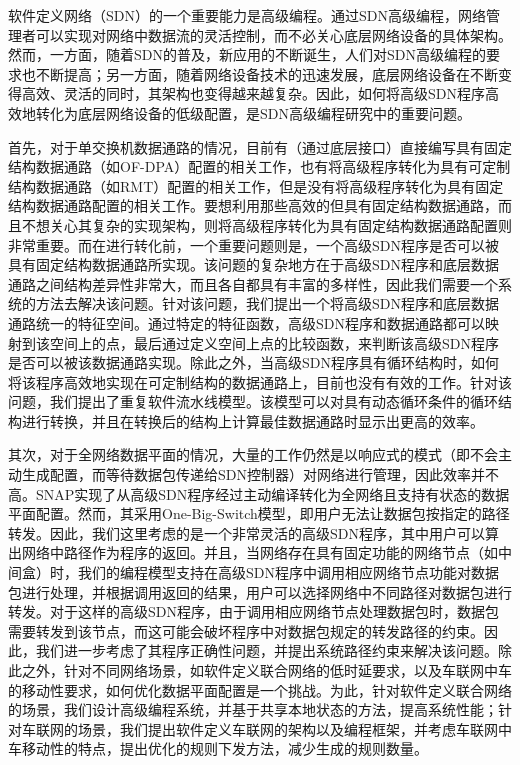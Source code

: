 \documentclass{ctexart}
\begin{document}
软件定义网络（SDN）的一个重要能力是高级编程。通过SDN高级编程，网络管理者可以实现对网络中数据流的灵活控制，而不必关心底层网络设备的具体架构。然而，一方面，随着SDN的普及，新应用的不断诞生，人们对SDN高级编程的要求也不断提高；另一方面，随着网络设备技术的迅速发展，底层网络设备在不断变得高效、灵活的同时，其架构也变得越来越复杂。因此，如何将高级SDN程序高效地转化为底层网络设备的低级配置，是SDN高级编程研究中的重要问题。

首先，对于单交换机数据通路的情况，目前有（通过底层接口）直接编写具有固定结构数据通路（如OF-DPA）配置的相关工作，也有将高级程序转化为具有可定制结构数据通路（如RMT）配置的相关工作，但是没有将高级程序转化为具有固定结构数据通路配置的相关工作。要想利用那些高效的但具有固定结构数据通路，而且不想关心其复杂的实现架构，则将高级程序转化为具有固定结构数据通路配置则非常重要。而在进行转化前，一个重要问题则是，一个高级SDN程序是否可以被具有固定结构数据通路所实现。该问题的复杂地方在于高级SDN程序和底层数据通路之间结构差异性非常大，而且各自都具有丰富的多样性，因此我们需要一个系统的方法去解决该问题。针对该问题，我们提出一个将高级SDN程序和底层数据通路统一的特征空间。通过特定的特征函数，高级SDN程序和数据通路都可以映射到该空间上的点，最后通过定义空间上点的比较函数，来判断该高级SDN程序是否可以被该数据通路实现。除此之外，当高级SDN程序具有循环结构时，如何将该程序高效地实现在可定制结构的数据通路上，目前也没有有效的工作。针对该问题，我们提出了重复软件流水线模型。该模型可以对具有动态循环条件的循环结构进行转换，并且在转换后的结构上计算最佳数据通路时显示出更高的效率。

其次，对于全网络数据平面的情况，大量的工作仍然是以响应式的模式（即不会主动生成配置，而等待数据包传递给SDN控制器）对网络进行管理，因此效率并不高。SNAP实现了从高级SDN程序经过主动编译转化为全网络且支持有状态的数据平面配置。然而，其采用One-Big-Switch模型，即用户无法让数据包按指定的路径转发。因此，我们这里考虑的是一个非常灵活的高级SDN程序，其中用户可以算出网络中路径作为程序的返回。并且，当网络存在具有固定功能的网络节点（如中间盒）时，我们的编程模型支持在高级SDN程序中调用相应网络节点功能对数据包进行处理，并根据调用返回的结果，用户可以选择网络中不同路径对数据包进行转发。对于这样的高级SDN程序，由于调用相应网络节点处理数据包时，数据包需要转发到该节点，而这可能会破坏程序中对数据包规定的转发路径的约束。因此，我们进一步考虑了其程序正确性问题，并提出系统路径约束来解决该问题。除此之外，针对不同网络场景，如软件定义联合网络的低时延要求，以及车联网中车的移动性要求，如何优化数据平面配置是一个挑战。为此，针对软件定义联合网络的场景，我们设计高级编程系统，并基于共享本地状态的方法，提高系统性能；针对车联网的场景，我们提出软件定义车联网的架构以及编程框架，并考虑车联网中车移动性的特点，提出优化的规则下发方法，减少生成的规则数量。
\end{document}
